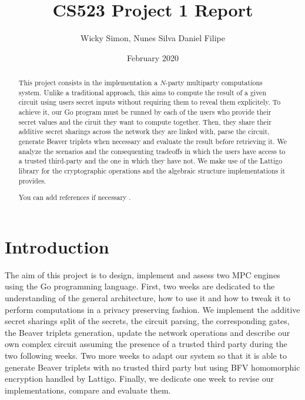 \documentclass[10pt,conference]{IEEEtran}
\title{CS523 Project 1 Report}
\author{Wicky Simon, Nunes Silva Daniel Filipe}
\date{February 2020}
\begin{document}
\maketitle

\begin{abstract}
This project consists in the implementation a $N$-party multiparty
computations system. Unlike a traditional approach, this aims to compute
the result of a given circuit using users secret inputs without requiring
them to reveal them explicitely. To achieve it, our Go program must be runned
by each of the users who provide their secret values and the ciruit they
want to compute together. Then, they share their additive secret sharings
across the network they are linked with, parse the circuit, generate Beaver
triplets when necessary and evaluate the result before retrieving it.
We analyze the scenarios and the consequenting tradeoffs in which the users
have access to a trusted third-party and the one in which they have not. We
make use of the Lattigo library for the cryptographic operations and the
algebraic structure implementations it provides.

You can add references if necessary \cite{article}. \\
\end{abstract}
\section{Introduction}
The aim of this project is to design, implement and assess two MPC engines using
the Go programming language. First, two weeks are dedicated to the understanding
of the general architecture, how to use it and how to tweak it to perform
computations in a privacy preserving fashion. We implement the additive secret
sharings split of the secrets, the circuit parsing, the corresponding gates, the
Beaver triplets generation, update the network operations and describe our own
complex circuit assuming the presence of a trusted third party during the two
following weeks. Two more weeks to adapt our system so that it is able to
generate Beaver triplets with no trusted third party but using BFV homomorphic
encryption handled by Lattigo. Finally, we dedicate one week to revise our
implementations, compare and evaluate them.

\end{document}
